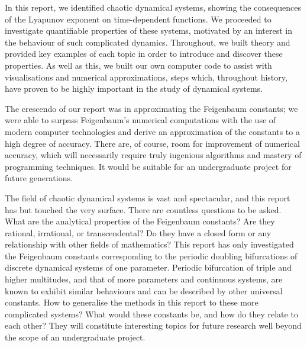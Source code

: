 In this report, we identified chaotic dynamical systems, showing the consequences of the Lyapunov exponent on time-dependent functions. We proceeded to investigate quantifiable properties of these systems, motivated by an interest in the behaviour of such complicated dynamics. Throughout, we built theory and provided key examples of each topic in order to introduce and discover these properties. As well as this, we built our own computer code to assist with visualisations and numerical approximations, steps which, throughout history, have proven to be highly important in the study of dynamical systems. 

The crescendo of our report was in approximating the Feigenbaum constants; we were able to surpass Feigenbaum's numerical computations with the use of modern computer technologies and derive an approximation of the constants to a high degree of accuracy.
There are, of course, room for improvement of numerical accuracy, which will necessarily require truly ingenious algorithms and mastery of programming techniques. 
It would be suitable for an undergraduate project for future generations.

The field of chaotic dynamical systems is vast and spectacular, and this report has but touched the very surface. 
There are countless questions to be asked. 
What are the analytical properties of the Feigenbaum constants? 
Are they rational, irrational, or transcendental? 
Do they have a closed form or any relationship with other fields of mathematics?
This report has only investigated the Feigenbaum constants corresponding to the periodic doubling bifurcations of discrete dynamical systems of one parameter. 
Periodic bifurcation of triple and higher multitudes, and that of more parameters and continuous systems, are known to exhibit similar behaviours and can be described by other universal constants. 
How to generalise the methods in this report to these more complicated systems? What would these constants be, and how do they relate to each other?
They will constitute interesting topics for future research well beyond the scope of an undergraduate project.